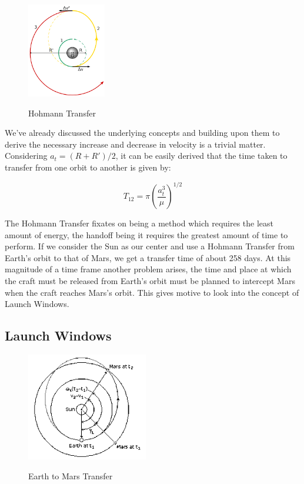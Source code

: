 \documentclass[12pt, letterpaper]{article}
\begin{document}
\begin{figure}[h!]
	\centering
    \includegraphics[width = 130px]{Hohmann}
    \label{fig:Hohmann}
    \caption{Hohmann Transfer}
\end{figure}

We've already discussed the underlying concepts and building upon them to derive the necessary increase and decrease in velocity is a trivial matter. Considering $a_t = (R + R')/2$, it can be easily derived that the time taken to transfer from one orbit to another is given by:

\[
	T_{12} = \pi \left(\frac{a_t^3}{\mu}\right)^{1/2}
\]

The Hohmann Transfer fixates on being a method which requires the least amount of energy, the handoff being it requires the greatest amount of time to perform. If we consider the Sun as our center and use a Hohmann Transfer from Earth's orbit to that of Mars, we get a transfer time of about 258 days. At this magnitude of a time frame another problem arises, the time and place at which the craft must be released from Earth's orbit must be planned to intercept Mars when the craft reaches Mars's orbit. This gives motive to look into the concept of Launch Windows.

\subsection{Launch Windows}
\begin{figure}[h!]
	\centering
    \includegraphics[width = 200px]{Mars}
    \label{fig:Mars}
    \caption{Earth to Mars Transfer}
\end{figure}
\end{document}

